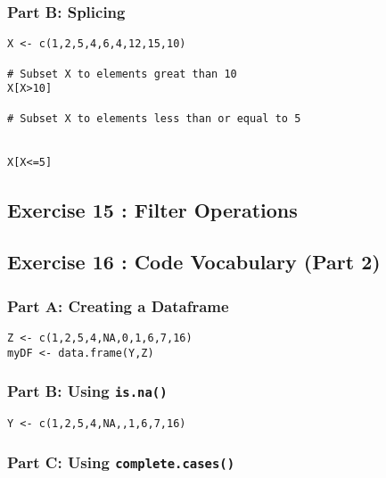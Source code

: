 \documentclass{article}
\begin{document}
\subsubsection*{Part B: Splicing}

\begin{framed}
\begin{verbatim}
X <- c(1,2,5,4,6,4,12,15,10)

# Subset X to elements great than 10
X[X>10]

# Subset X to elements less than or equal to 5


X[X<=5]
\end{verbatim}
\end{framed}



\subsection*{Exercise 15 : Filter Operations}


\subsection*{Exercise 16 : Code Vocabulary (Part 2)}
\subsubsection*{Part A: Creating a Dataframe}

\begin{framed}
\begin{verbatim}
Z <- c(1,2,5,4,NA,0,1,6,7,16)
myDF <- data.frame(Y,Z)

\end{verbatim}
\end{framed}

\subsubsection*{Part B: Using \texttt{is.na()}}

\begin{framed}
\begin{verbatim}
Y <- c(1,2,5,4,NA,,1,6,7,16)

\end{verbatim}
\end{framed}


\subsubsection*{Part C: Using \texttt{complete.cases()}}
\end{document}
